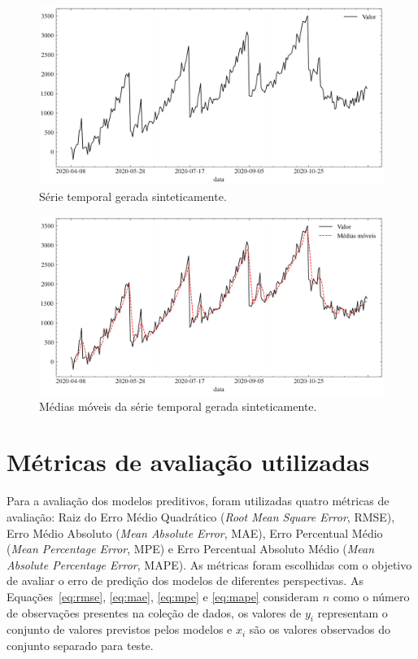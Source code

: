 \begin{figure}[!htp]
    \centering
    \includegraphics[width=5.0in]{img/dados_sinteticos.pdf}
    \caption{Série temporal gerada sinteticamente.}\label{fig:dados_sinteticos}
\end{figure}


\begin{figure}[!htp]
    \centering
    \includegraphics[width=5.0in]{img/dados_sinteticos_ma.pdf}
    \caption{Médias móveis da série temporal gerada sinteticamente.}\label{fig:dados_sinteticos_ma}
\end{figure}

\FloatBarrier

\section{Métricas de avaliação utilizadas}\label{sec:metrics}
Para a avaliação dos modelos preditivos, foram utilizadas quatro métricas de avaliação:  Raiz do Erro Médio Quadrático (\textit{Root Mean Square Error}, RMSE), Erro Médio Absoluto (\textit{Mean Absolute Error}, MAE), Erro Percentual Médio (\textit{Mean Percentage Error}, MPE) e Erro Percentual Absoluto Médio (\textit{Mean Absolute Percentage Error}, MAPE). As métricas foram escolhidas com o objetivo de avaliar o erro de predição dos modelos de diferentes perspectivas. As Equações~\ref{eq:rmse}, \ref{eq:mae}, \ref{eq:mpe} e \ref{eq:mape} consideram $n$ como o número de observações presentes na coleção de dados, os valores de $y_{i}$ representam o conjunto de valores previstos pelos modelos e $x_{i}$ são os valores observados do conjunto separado para teste.


